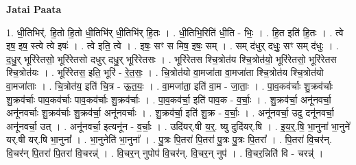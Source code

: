 \documentclass[17pt]{extarticle}
\begin{document}
\textbf{Jatai Paata} \newline

1. धी॒तिभिर्॑. हि॒तो हि॒तो धी॒तिभि॑र् धी॒तिभि॑र् हि॒तः । . धी॒तिभि॒रिति॑ धी॒ति - भिः॒ । . हि॒त इति॑ हि॒तः । . त्वे इष॒ इष॒ स्त्वे त्वे इषः॑ । . त्वे इति॒ त्वे । . इषः॒ सꣳ स मिष॒ इषः॒ सम् । . सम् द॑धुर् दधुः॒ सꣳ सम् द॑धुः । . द॒धु॒र् भूरि॑रेतसो॒ भूरि॑रेतसो दधुर् दधु॒र् भूरि॑रेतसः । . भूरि॑रेतस श्चि॒त्रोत॑य श्चि॒त्रोत॑यो॒ भूरि॑रेतसो॒ भूरि॑रेतस श्चि॒त्रोत॑यः । . भूरि॑रेतस॒ इति॒ भूरि॑ - रे॒त॒सः॒ । . चि॒त्रोत॑यो वा॒मजा॑ता वा॒मजा॑ता श्चि॒त्रोत॑य श्चि॒त्रोत॑यो वा॒मजा॑ताः । . चि॒त्रोत॑य॒ इति॑ चि॒त्र - ऊ॒त॒यः॒ । . वा॒मजा॑ता॒ इति॑ वा॒म - जा॒ताः॒ । . पा॒व॒कव॑र्चाः शु॒क्रव॑र्चाः शु॒क्रव॑र्चाः पाव॒कव॑र्चाः पाव॒कव॑र्चाः शु॒क्रव॑र्चाः । . पा॒व॒कव॑र्चा॒ इति॑ पाव॒क - व॒र्चाः॒ । . शु॒क्रव॑र्चा॒ अनू॑नवर्चा॒ अनू॑नवर्चाः शु॒क्रव॑र्चाः शु॒क्रव॑र्चा॒ अनू॑नवर्चाः । . शु॒क्रव॑र्चा॒ इति॑ शु॒क्र - व॒र्चाः॒ । . अनू॑नवर्चा॒ उदु दनू॑नवर्चा॒ अनू॑नवर्चा॒ उत् । . अनू॑नवर्चा॒ इत्यनू॑न - व॒र्चाः॒ । . उदि॑यर्.षी य॒र्॒. ष्यु दुदि॑यर्.षि । . इ॒य॒र्॒.षि॒ भा॒नुना॑ भा॒नुने॑ यर्.षी यर्.षि भा॒नुना᳚ । . भा॒नुनेति॑ भा॒नुना᳚ । . पु॒त्रः पि॒तरा॑ पि॒तरा॑ पु॒त्रः पु॒त्रः पि॒तरा᳚ । . पि॒तरा॑ वि॒चर॑न्. वि॒चर॑न् पि॒तरा॑ पि॒तरा॑ वि॒चरन्न्॑ । . वि॒चर॒न् नुपोप॑ वि॒चर॑न्. वि॒चर॒न् नुप॑ । . वि॒चर॒न्निति॑ वि - चरन्न्॑ । \newline
\end{document}
